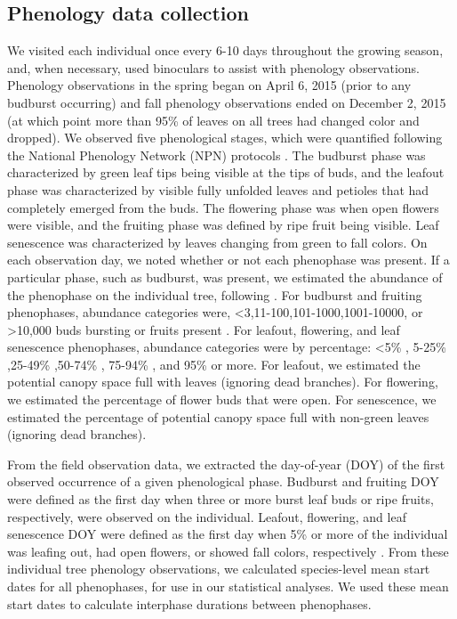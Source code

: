 \documentclass{article}
\begin{document}
\subsection*{Phenology data collection}
We visited each individual once every 6-10 days throughout the growing season, and, when necessary, used binoculars to assist with phenology observations. Phenology observations in the spring began on April 6, 2015 (prior to any budburst occurring) and fall phenology observations ended on December 2, 2015 (at which point more than 95\% of leaves on all trees had changed color and dropped). We observed five phenological stages, which were quantified following the National Phenology Network (NPN) protocols \citep[for a full description see][]{denny2014}. The budburst phase was characterized by green leaf tips being visible at the tips of buds, and the leafout phase was characterized by visible fully unfolded leaves and petioles that had completely emerged from the buds. The flowering phase was when open flowers were visible, and the fruiting phase was defined by ripe fruit being visible. Leaf senescence was characterized by leaves changing from green to fall colors. On each observation day, we noted whether or not each phenophase was present. If a particular phase, such as budburst, was present, we estimated the abundance of the phenophase on the individual tree, following \citet{denny2014}. For budburst and fruiting phenophases, abundance categories were, <3,11-100,101-1000,1001-10000, or >10,000 buds bursting or fruits present \citep{denny2014}. For leafout, flowering, and leaf senescence phenophases, abundance categories were by percentage: <5\% , 5-25\% ,25-49\% ,50-74\% , 75-94\% , and 95\%  or more. For leafout, we estimated the potential canopy space full with leaves (ignoring dead branches). For flowering, we estimated the percentage of flower buds that were open. For senescence, we estimated the percentage of potential canopy space full with non-green leaves (ignoring dead branches). 
\par From the field observation data, we extracted the day-of-year (DOY) of the first observed occurrence of a given phenological phase. Budburst and fruiting DOY were defined as the first day when three or more burst leaf buds or ripe fruits, respectively, were observed on the individual. Leafout, flowering, and leaf senescence DOY were defined as the first day when 5\% or more of the individual was leafing out, had open flowers, or showed fall colors, respectively \citep{denny2014}. 
From these individual tree phenology observations, we calculated species-level mean start dates for all phenophases, for use in our statistical analyses. We used these mean start dates to calculate interphase durations between phenophases. 
\end{document}
